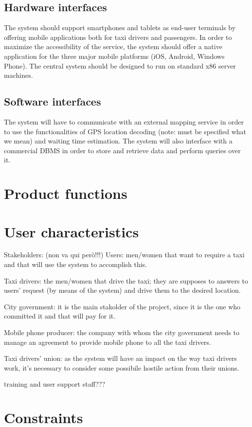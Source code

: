 \documentclass{book}
\begin{document}
\subsection{Hardware interfaces}
The system should support smartphones and tablets as end-user terminals by offering mobile applications both for taxi drivers and passengers. 
In order to maximize the accessibility of the service, the system should offer a native application for the three major mobile platforms (iOS, Android, Windows Phone). 
The central system should be designed to run on standard x86 server machines.

\subsection{Software interfaces}
The system will have to communicate with an external mapping service in order to use the functionalities of GPS location decoding (note: must be specified what we mean) and waiting time estimation. 
The system will also interface with a commercial DBMS in order to store and retrieve data and perform queries over it.

\section{Product functions}

\section{User characteristics}
Stakeholders: (non va qui però!!!)
Users: men/women that want to require a taxi and that will use the system to accomplish this.

Taxi drivers: the men/women that drive the taxi; they are supposes to answers to users' request (by means of the system) and drive them to the desired location.

City government: it is the main stakolder of the project, since it is the one who committed it and that will pay for it.

Mobile phone producer: the company with whom the city government needs to manage an agreement  to provide mobile phone to all the taxi drivers.

Taxi drivers’ union: as the system will have an impact on the way taxi drivers work, it's necessary to consider some possibile hostile action from their unions.

training and user support staff???

\section{Constraints}
\end{document}
